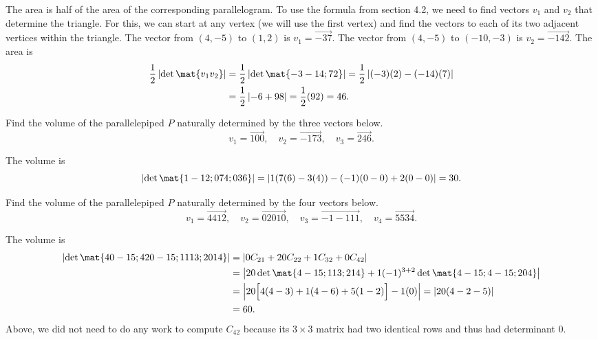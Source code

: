 \begin{problems}
\begin{solution}
  The area is half of the area of the corresponding parallelogram.  To use the
  formula from section 4.2, we need to find vectors $v_1$ and $v_2$ that
  determine the triangle. For this, we can start at any vertex
  (we will use the first vertex) and find the vectors to each of its two
  adjacent vertices within the triangle.  \newline %
  The vector from $(4, -5)$ to $(1, 2)$ is $v_1 = \vec{-3 7}$. \newline %
  The vector from $(4, -5)$ to $(-10, -3)$ is $v_2 = \vec{-14 2}$. \newline %
  The area is
  \begin{align*}
    \dfrac{1}{2} \left|\det\mat{v_1 v_2}\right| %
    & = \dfrac{1}{2} \left|\det\mat{-3 -14; 7 2}\right| %
    = \dfrac{1}{2}\left|(-3)(2)-(-14)(7)\right| \\ %
    & = \dfrac{1}{2}\left|-6 + 98\right| = \dfrac{1}{2}(92) = 46.
  \end{align*}
\end{solution}  


\problem %
Find the volume of the parallelepiped $P$ naturally determined by the three
vectors below.
\[v_1 = \vec{1 0 0}, \quad v_2 = \vec{-1 7 3}, \quad v_3 = \vec{2 4 6}.\]
\begin{solution}
The volume is
\[\left|\det\mat{1 -1 2; 0 7 4; 0 3 6}\right| =
  |1(7(6)-3(4)) - (-1)(0-0) + 2(0-0)| = 30.\]
\end{solution}


\problem %
Find the volume of the parallelepiped $P$ naturally determined by the four
vectors below.
\[v_1 = \vec{4 4 1 2}, \quad v_2 = \vec{0 20 1 0}, \quad v_3 = \vec{-1 -1 1 1},
  \quad v_4 = \vec{5 5 3 4}.\]
\begin{solution}
The volume is
\begin{align*}
  \left|\det\mat{4 0 -1 5; 4 20 -1 5; 1 1 1 3; 2 0 1 4}\right|
  & = \left| 0C_{21} + 20C_{22} + 1C_{32} + 0 C_{42}\right| \\
  & = \left| 20 \det\mat{4 -1 5; 1 1 3; 2 1 4} +
    1(-1)^{3+2} \det \mat{4 -1 5; 4 -1 5; 2 0 4}\right| \\
  & = \left| 20 \Big[4(4-3)+1(4-6)+5(1-2)\Big] -1 (0)\right| = \left|20(4-2-5)\right|\\
  & = 60.
\end{align*}
Above, we did not need to do any work to compute $C_{42}$ because its
$3 \times 3$ matrix had two identical rows and thus had determinant $0$.
\end{solution}



\end{problems}
